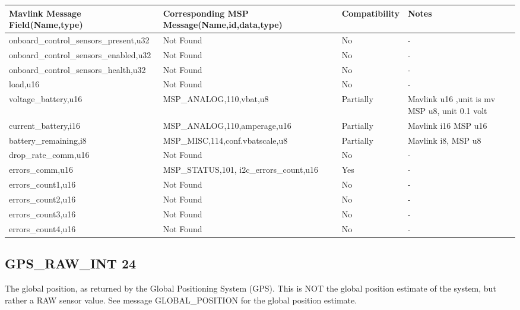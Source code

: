 {
\centering
\begin{tabular}{ |p{4cm} |p{7cm} | p{2cm}|m{5em}|}
\hline
Mavlink Message Field(Name,type)&Corresponding MSP Message(Name,id,data,type)& Compatibility & Notes\\
\hline
onboard\_control\_sensors\_present,u32 & Not Found & No & - \\
\hline
\hline
onboard\_control\_sensors\_enabled,u32 & Not Found & No & - \\
\hline
onboard\_control\_sensors\_health,u32 & Not Found & No & - \\
\hline
load,u16 & Not Found & No & - \\
\hline
\rowcolor{lightgray}
voltage\_battery,u16 & MSP\_ANALOG,110,vbat,u8 & Partially &  Mavlink u16 ,unit is mv MSP u8, unit 0.1 volt  \\
\rowcolor{lightgray}
\hline
current\_battery,i16 &  MSP\_ANALOG,110,amperage,u16 & Partially & Mavlink i16 MSP u16 \\
\hline
\rowcolor{lightgray}
battery\_remaining,i8 & MSP\_MISC,114,conf.vbatscale,u8 & Partially &  Mavlink i8, MSP u8  \\
\hline
drop\_rate\_comm,u16 & Not Found & No & - \\
\hline
\rowcolor{green}
errors\_comm,u16 & MSP\_STATUS,101, i2c\_errors\_count,u16 & Yes &  - \\
\hline
errors\_count1,u16 & Not Found & No & - \\
\hline
errors\_count2,u16 & Not Found & No & - \\
\hline
errors\_count3,u16 & Not Found & No & - \\
\hline
errors\_count4,u16 & Not Found & No & - \\

\end{tabular}
}
\cleardoublepage



\subsection{GPS\_RAW\_INT 24} 
The global position, as returned by the Global Positioning System (GPS). This is NOT the global position estimate of the system, but rather a RAW sensor value. See message GLOBAL\_POSITION for the global position estimate. \\ 

